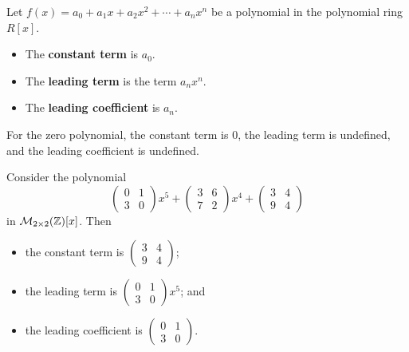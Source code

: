 \begin{definition}
    Let $f(x) = a_0 + a_1x + a_2x^2 + \cdots + a_nx^n$ be a polynomial in the polynomial ring $R[x]$.
    \begin{itemize}
        \item The \textbf{constant term} is $a_0$.
        \item The \textbf{leading term} is the term $a_nx^n$.
        \item The \textbf{leading coefficient} is $a_n$.
    \end{itemize}
\end{definition}
\begin{remark}
    For the zero polynomial, the constant term is 0, the leading term is undefined, and the leading coefficient is undefined.
\end{remark}
\begin{example}
    Consider the polynomial
    \[
        \begin{pmatrix}0&1\\3&0\end{pmatrix}x^5 + \begin{pmatrix}3&6\\7&2\end{pmatrix}x^4 + \begin{pmatrix}3&4\\9&4\end{pmatrix}
    \]
    in $\mathcal{M}_{2\times2}(\mathbb{Z})[x]$. Then
    \begin{itemize}
        \item the constant term is $\begin{pmatrix}3&4\\9&4\end{pmatrix}$;
        \item the leading term is $\begin{pmatrix}0&1\\3&0\end{pmatrix}x^5$; and
        \item the leading coefficient is $\begin{pmatrix}0&1\\3&0\end{pmatrix}$.
    \end{itemize}
\end{example}


